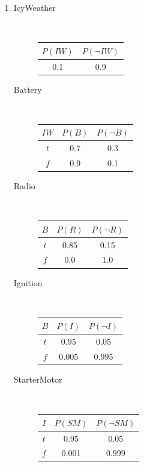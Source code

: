 \documentclass[10pt]{article}
\begin{document}
\begin{enumerate}
\begin{enumerate}
  \item %
    \begin{description}
    \item[IcyWeather]
      \ \\
      \begin{tabular}{|c|c|}
      \hline
      $P(IW)$ & $P(\neg IW)$ \\ \hline
      0.1     & 0.9 \\
      \hline
      \end{tabular}

    \item[Battery]
      \ \\
      \begin{tabular}{|c|c|c|}
      \hline
      $IW$ & $P(B)$ & $P(\neg B)$ \\ \hline
      $t$  & 0.7    & 0.3 \\
      $f$  & 0.9    & 0.1 \\
      \hline
      \end{tabular}

    \item[Radio]
      \ \\
      \begin{tabular}{|c|c|c|}
      \hline
      $B$ & $P(R)$ & $P(\neg R)$ \\ \hline
      $t$  & 0.85    & 0.15   \\
      $f$  & 0.0    & 1.0 \\
      \hline
      \end{tabular}

    \item[Ignition]
      \ \\
      \begin{tabular}{|c|c|c|}
      \hline
      $B$ & $P(I)$ & $P(\neg I)$ \\ \hline
      $t$  & 0.95   & 0.05   \\
      $f$  & 0.005  & 0.995 \\
      \hline
      \end{tabular}

    \item[StarterMotor]
      \ \\
      \begin{tabular}{|c|c|c|}
      \hline
      $I$ & $P(SM)$ & $P(\neg SM)$ \\ \hline
      $t$  & 0.95   & 0.05   \\
      $f$  & 0.001  & 0.999 \\
      \hline
      \end{tabular}


\end{description}
\end{enumerate}
\end{enumerate}
\end{document}

